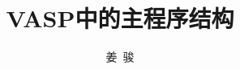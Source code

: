 
\title{\rm{VASP}中的主程序结构}
\author[ ]{姜~骏}   %
\renewcommand*{\Authfont}{\small\rm} %
\renewcommand*{\Affilfont}{\small\it} %
\renewcommand\Authands{ and } %
\renewcommand\Authands{ , } %
\date{} %



